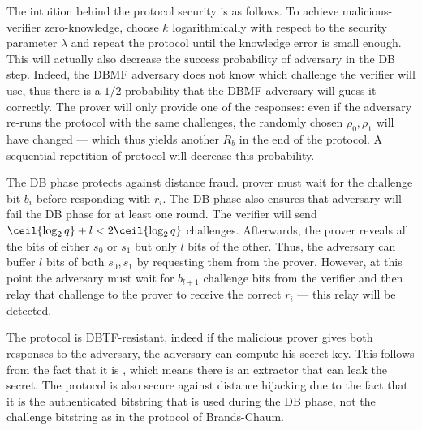 The intuition behind the protocol security is as follows.
To achieve malicious-verifier zero-knowledge, choose \(k\) logarithmically with respect to the security parameter \(\lambda\) and repeat the protocol until the knowledge error is small enough.
This will actually also decrease the success probability of  adversary in the \ac{DB} step.
Indeed, the \ac{DBMF} adversary does not know which challenge the verifier will use, thus there is a \(1/2\) probability that the \ac{DBMF} adversary will guess it correctly.
The prover will only provide one of the responses: even if the adversary re-runs the protocol with the same challenges, the randomly chosen \(\rho_0, \rho_1\) will have changed --- which thus yields another \(R_b\) in the end of the protocol.
A sequential repetition of protocol will decrease this probability.

The \ac{DB} phase protects against distance fraud.
 prover must wait for the challenge bit \(b_i\) before responding with \(r_i\).
The \ac{DB} phase also ensures that  adversary will fail the \ac{DB} phase for at least one round.
The verifier will send \(\ceil{\log_2 q} + l < 2\ceil{\log_2 q}\) challenges.
Afterwards, the prover reveals all the bits of either \(s_0\) or \(s_1\) but only \(l\) bits of the other.
Thus, the adversary can buffer \(l\) bits of both \(s_0, s_1\) by requesting them from the prover.
However, at this point the adversary must wait for \(b_{l+1}\) challenge bits from the verifier and then relay that challenge to the prover to receive the correct \(r_i\) --- this relay will be detected.

The protocol is \ac{DBTF}-resistant, indeed if the malicious prover gives both responses to the adversary, the adversary can compute his secret key.
This follows from the fact that it is , which means there is an extractor that can leak the secret.
The protocol is also secure against distance hijacking due to the fact that it is the authenticated bitstring that is used during the \ac{DB} phase, not the challenge bitstring as in the protocol of Brands-Chaum.
